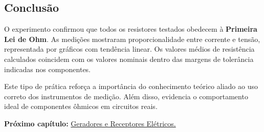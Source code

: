 \subsection{Conclusão}
O experimento confirmou que todos os resistores testados obedecem à \textbf{Primeira Lei de Ohm}. As medições mostraram proporcionalidade entre corrente e tensão, representada por gráficos com tendência linear. Os valores médios de resistência calculados coincidem com os valores nominais dentro das margens de tolerância indicadas nos componentes.

Este tipo de prática reforça a importância do conhecimento teórico aliado ao uso correto dos instrumentos de medição. Além disso, evidencia o comportamento ideal de componentes ôhmicos em circuitos reais.

\vspace{0.5cm}
\noindent\textbf{Próximo capítulo:} \hyperref[cap6]{Geradores e Receptores Elétricos.}
